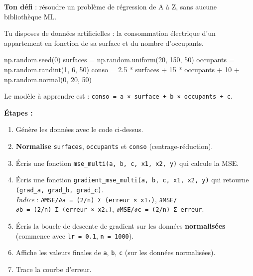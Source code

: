 \documentclass[
  french,
  11pt,
  a4paper,
]{scrbook}
\newenvironment{Shaded}{}{}
\newcommand{\DecValTok}[1]{\textcolor[rgb]{0.00,0.36,0.77}{#1}}
\newcommand{\FloatTok}[1]{\textcolor[rgb]{0.00,0.36,0.77}{#1}}
\newcommand{\NormalTok}[1]{\textcolor[rgb]{0.14,0.16,0.18}{#1}}
\newcommand{\OperatorTok}[1]{\textcolor[rgb]{0.14,0.16,0.18}{#1}}
\providecommand{\tightlist}{%
  \setlength{\itemsep}{0pt}\setlength{\parskip}{0pt}}
\begin{document}
\begin{tcolorbox}[enhanced jigsaw, arc=.35mm, bottomrule=.15mm, bottomtitle=1mm, breakable, colback=white, colbacktitle=quarto-callout-note-color!10!white, colframe=quarto-callout-note-color-frame, coltitle=black, left=2mm, leftrule=.75mm, opacityback=0, opacitybacktitle=0.6, rightrule=.15mm, title={📝 Énoncé}, titlerule=0mm, toprule=.15mm, toptitle=1mm]

\textbf{Ton défi} : résoudre un problème de régression de A à Z, sans
aucune bibliothèque ML.

Tu disposes de données artificielles : la consommation électrique d'un
appartement en fonction de sa surface et du nombre d'occupants.

\begin{Shaded}
\begin{Highlighting}[]
\NormalTok{np.random.seed(}\DecValTok{0}\NormalTok{)}
\NormalTok{surfaces }\OperatorTok{=}\NormalTok{ np.random.uniform(}\DecValTok{20}\NormalTok{, }\DecValTok{150}\NormalTok{, }\DecValTok{50}\NormalTok{)}
\NormalTok{occupants }\OperatorTok{=}\NormalTok{ np.random.randint(}\DecValTok{1}\NormalTok{, }\DecValTok{6}\NormalTok{, }\DecValTok{50}\NormalTok{)}
\NormalTok{conso }\OperatorTok{=} \FloatTok{2.5} \OperatorTok{*}\NormalTok{ surfaces }\OperatorTok{+} \DecValTok{15} \OperatorTok{*}\NormalTok{ occupants }\OperatorTok{+} \DecValTok{10} \OperatorTok{+}\NormalTok{ np.random.normal(}\DecValTok{0}\NormalTok{, }\DecValTok{20}\NormalTok{, }\DecValTok{50}\NormalTok{)}
\end{Highlighting}
\end{Shaded}

Le modèle à apprendre est :
\texttt{conso\ =\ a\ ×\ surface\ +\ b\ ×\ occupants\ +\ c}.

\textbf{Étapes :}

\begin{enumerate}
\def\labelenumi{\arabic{enumi}.}
\tightlist
\item
  Génère les données avec le code ci-dessus.
\item
  \textbf{Normalise} \texttt{surfaces}, \texttt{occupants} et
  \texttt{conso} (centrage-réduction).
\item
  Écris une fonction \texttt{mse\_multi(a,\ b,\ c,\ x1,\ x2,\ y)} qui
  calcule la MSE.
\item
  Écris une fonction
  \texttt{gradient\_mse\_multi(a,\ b,\ c,\ x1,\ x2,\ y)} qui retourne
  \texttt{(grad\_a,\ grad\_b,\ grad\_c)}.\\
  \emph{Indice} : \texttt{∂MSE/∂a\ =\ (2/n)\ Σ\ (erreur\ ×\ x1ᵢ)},
  \texttt{∂MSE/∂b\ =\ (2/n)\ Σ\ (erreur\ ×\ x2ᵢ)},
  \texttt{∂MSE/∂c\ =\ (2/n)\ Σ\ erreur}.
\item
  Écris la boucle de descente de gradient sur les données
  \textbf{normalisées} (commence avec \texttt{lr\ =\ 0.1},
  \texttt{n\ =\ 1000}).
\item
  Affiche les valeurs finales de \texttt{a}, \texttt{b}, \texttt{c} (sur
  les données normalisées).
\item
  Trace la courbe d'erreur.
\end{enumerate}


\end{tcolorbox}
\end{document}
